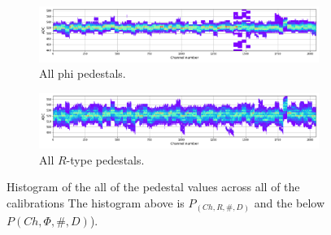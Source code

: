 \begin{figure}
    \centering

    \begin{subfigure}[b]{\textwidth}
    \includegraphics[width=\linewidth]{figures/chapter4/calib_analysis/Part1-phi-pedestals.png}
    \caption{All phi pedestals.}
   \label{plot:ped_r}
  \end{subfigure}

  \begin{subfigure}[b]{\textwidth}
    \includegraphics[width=\linewidth]{figures/chapter4/calib_analysis/Part1-r-pedestals.png}
    \caption{All $R$-type pedestals.}
   \label{plot:ped_phi}
  \end{subfigure}
    \caption{Histogram of the all of the pedestal values across all of the calibrations The histogram above is $P_(Ch, R, \#, D)$ and the below $P(Ch, \Phi, \#, D)$).}
    \label{plot:part1-r-phi-pedestals}

  \end{figure}


